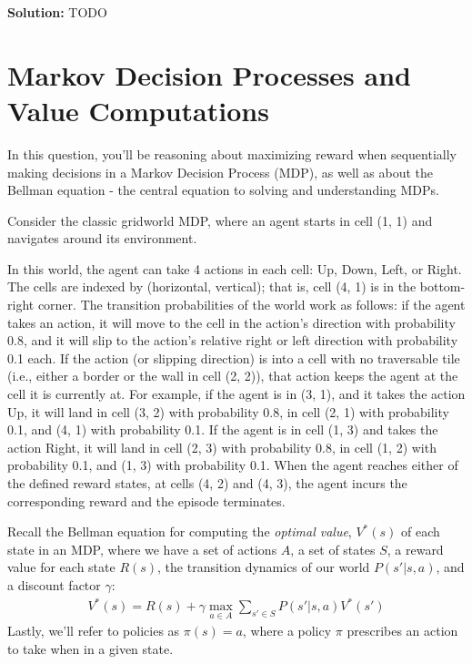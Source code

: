 \documentclass{article}
\newcommand{\Question}[1]{\Large \section{ #1 } \normalsize}
\newenvironment{solution}{\color{blue} \smallskip \textbf{Solution:}}{}
\begin{document}
\begin{solution}
TODO
\end{solution}

\clearpage
\Question{Markov Decision Processes and Value Computations}
In this question, you'll be reasoning about maximizing reward when sequentially making decisions in a Markov Decision Process (MDP), as well as about the Bellman equation - the central equation to solving and understanding MDPs.

Consider the classic gridworld MDP, where an agent starts in cell (1, 1) and navigates around its environment. 

In this world, the agent can take 4 actions in each cell: Up, Down, Left, or Right. The cells are indexed by (horizontal, vertical); that is, cell (4, 1) is in the bottom-right corner. The transition probabilities of the world work as follows: if the agent takes an action, it will move to the cell in the action's direction with probability 0.8, and it will slip to the action's relative right or left direction with probability 0.1 each. If the action (or slipping direction) is into a cell with no traversable tile (i.e., either a border or the wall in cell (2, 2)), that action keeps the agent at the cell it is currently at. For example, if the agent is in (3, 1), and it takes the action Up, it will land in cell (3, 2) with probability
0.8, in cell (2, 1) with probability 0.1, and (4, 1) with probability 0.1. If the agent is in cell (1, 3) and takes the action Right, it will land in cell (2, 3) with probability 0.8, in cell (1, 2) with probability 0.1, and (1, 3) with probability 0.1. When the agent reaches either of the defined reward states, at cells (4, 2) and (4, 3), the agent incurs the corresponding reward and the episode terminates. 

Recall the Bellman equation for computing the \textit{optimal value}, $V^{*}(s)$ of each state in an MDP, where we have a set of actions $A$, a set of states $S$, a reward value for each state $R(s)$, the transition dynamics of our world $P(s' | s, a)$, and a discount factor $\gamma$:
\begin{align*}
V^{*}(s) = R(s) + \gamma \max_{a \in A} \sum_{s' \in S} P(s' | s, a) V^{*}(s')
\end{align*}
Lastly, we'll refer to policies as $\pi(s) = a$, where a policy $\pi$ prescribes an action to take when in a given state.
\end{document}
